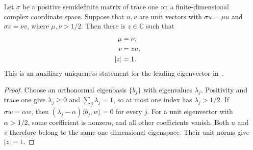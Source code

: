\begin{theorem}
    \label{thm:dominant_eigenvector_phase_uniqueness}
    \leanok
    Let $\sigma$ be a positive semidefinite matrix of trace one on a
    finite-dimensional complex coordinate space. Suppose that $u,v$ are
    unit vectors with $\sigma u=\mu u$ and $\sigma v=\nu v$, where
    $\mu,\nu>1/2$. Then there is $z\in\mathbb C$ such that
    \begin{align}
        \mu & =\nu,\notag \\
        v   & =zu,\notag  \\
        |z| & =1.\notag
    \end{align}
    This is an auxiliary uniqueness statement for the leading eigenvector
    in~\cite[Lemma~2.5, source lines 493--505]{Landau2013PolynomialTime}.
\end{theorem}
\begin{proof}\leanok
    Choose an orthonormal eigenbasis $\{b_j\}$ with eigenvalues $\lambda_j$.
    Positivity and trace one give $\lambda_j\ge0$ and
    $\sum_j\lambda_j=1$, so at most one index has $\lambda_j>1/2$.
    If $\sigma w=\alpha w$, then
    $(\lambda_j-\alpha)\langle b_j,w\rangle=0$ for every $j$.
    For a unit eigenvector with $\alpha>1/2$, some coefficient is nonzero,
    and all other coefficients vanish. Both $u$ and $v$ therefore belong
    to the same one-dimensional eigenspace. Their unit norms give $|z|=1$.
\end{proof}

